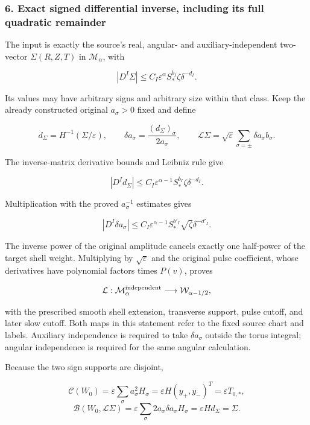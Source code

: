\documentclass[10pt,a4paper]{article}
\begin{document}
\subsubsection{6. Exact signed differential inverse, including its full quadratic remainder}

The input is exactly the source's real, angular- and auxiliary-independent two-vector \(\Sigma(R,Z,T)\) in \(\mathcal M_\alpha\), with

\[
|D^I\Sigma|\le C_I\varepsilon^\alpha S_*^{b_I}\zeta\delta^{-d_I}.
\]

Its values may have arbitrary signs and arbitrary size within that class. Keep the already constructed original \(a_\sigma>0\) fixed and define

\[
d_\Sigma=H^{-1}(\Sigma/\varepsilon),\qquad
\delta a_\sigma=\frac{(d_\Sigma)_\sigma}{2a_\sigma},\qquad
\mathcal L\Sigma=\sqrt\varepsilon\sum_{\sigma=\pm}\delta a_\sigma b_\sigma.
\]

The inverse-matrix derivative bounds and Leibniz rule give

\[
|D^Id_\Sigma|\le C_I\varepsilon^{\alpha-1}S_*^{b_I}\zeta\delta^{-d_I}.
\]

Multiplication with the proved \(a_\sigma^{-1}\) estimates gives

\[
|D^I\delta a_\sigma|\le C_I\varepsilon^{\alpha-1}S_*^{b'_I}
\sqrt\zeta\delta^{-d'_I}.
\]

The inverse power of the original amplitude cancels exactly one half-power of the target shell weight. Multiplying by \(\sqrt\varepsilon\) and the original pulse coefficient, whose derivatives have polynomial factors times \(P(v)\), proves

\[
\mathcal L:\mathcal M_\alpha^{\rm independent}\longrightarrow
\mathcal W_{\alpha-1/2},
\]

with the prescribed smooth shell extension, transverse support, pulse cutoff, and later slow cutoff. Both maps in this statement refer to the fixed source chart and labels. Auxiliary independence is required to take \(\delta a_\sigma\) outside the torus integral; angular independence is required for the same angular calculation.

Because the two sign supports are disjoint,

\[
\mathcal C(W_0)=\varepsilon\sum_\sigma a_\sigma^2H_\sigma
=\varepsilon H(y_+,y_-)^T=\varepsilon T_{0,*},
\] \[
\mathcal B(W_0,\mathcal L\Sigma)
=\varepsilon\sum_\sigma2a_\sigma\delta a_\sigma H_\sigma
=\varepsilon H d_\Sigma=\Sigma.
\]
\end{document}
